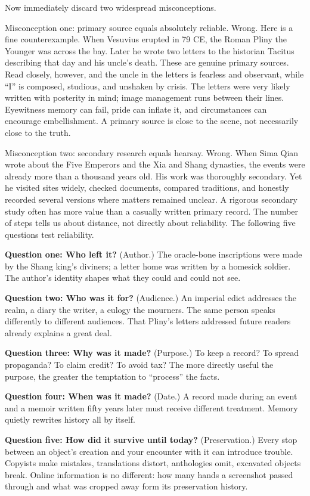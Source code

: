 Now immediately discard two widespread misconceptions.

Misconception one: primary source equals absolutely reliable. Wrong. Here is a fine counterexample. When Vesuvius erupted in 79 CE, the Roman Pliny the Younger was across the bay. Later he wrote two letters to the historian Tacitus describing that day and his uncle's death. These are genuine primary sources. Read closely, however, and the uncle in the letters is fearless and observant, while ``I'' is composed, studious, and unshaken by crisis. The letters were very likely written with posterity in mind; image management runs between their lines. Eyewitness memory can fail, pride can inflate it, and circumstances can encourage embellishment. A primary source is close to the scene, not necessarily close to the truth.

Misconception two: secondary research equals hearsay. Wrong. When Sima Qian wrote about the Five Emperors and the Xia and Shang dynasties, the events were already more than a thousand years old. His work was thoroughly secondary. Yet he visited sites widely, checked documents, compared traditions, and honestly recorded several versions where matters remained unclear. A rigorous secondary study often has more value than a casually written primary record. The number of steps tells us about distance, not directly about reliability. The following five questions test reliability.

\textbf{Question one: Who left it?} (Author.) The oracle-bone inscriptions were made by the Shang king's diviners; a letter home was written by a homesick soldier. The author's identity shapes what they could and could not see.

\textbf{Question two: Who was it for?} (Audience.) An imperial edict addresses the realm, a diary the writer, a eulogy the mourners. The same person speaks differently to different audiences. That Pliny's letters addressed future readers already explains a great deal.

\textbf{Question three: Why was it made?} (Purpose.) To keep a record? To spread propaganda? To claim credit? To avoid tax? The more directly useful the purpose, the greater the temptation to ``process'' the facts.

\textbf{Question four: When was it made?} (Date.) A record made during an event and a memoir written fifty years later must receive different treatment. Memory quietly rewrites history all by itself.

\textbf{Question five: How did it survive until today?} (Preservation.) Every stop between an object's creation and your encounter with it can introduce trouble. Copyists make mistakes, translations distort, anthologies omit, excavated objects break. Online information is no different: how many hands a screenshot passed through and what was cropped away form its preservation history.

